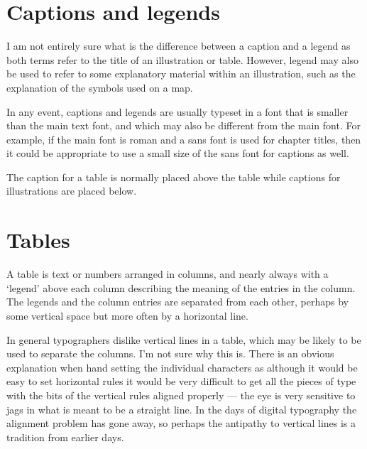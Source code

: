 \documentclass[10pt,letterpaper]{memoir}
\begin{document}
\section{Captions and legends}


    I am not entirely sure what is the difference between a
caption and a legend as both terms refer to the title of an illustration
or table. However, legend may also be used to refer to some explanatory 
material within an illustration, such as the explanation of the symbols
used on a map.

    In any event, captions and legends are usually typeset in a font that
is smaller than the main text font, and which may also be different from the
main font. For example, if the main font is roman and a sans font is used
for chapter titles, then it could be appropriate to use a small size
of the sans font for captions as well.

    The caption for a table is normally placed above the table while
captions for illustrations are placed below.


\section{Tables}


    A table is text or numbers arranged in columns, and nearly always
with a `legend' above each column describing the meaning of
the entries in the column. The legends and the column entries are
separated from each other, perhaps by some vertical space but more often
by a horizontal line.

    In general typographers dislike vertical lines in a table, which may
be likely to be used to separate the columns. I'm not sure why this is.
There is an obvious explanation when hand setting the individual characters
as although it would be easy to set horizontal rules it would be very 
difficult to get all the pieces of type with the bits of the vertical rules
aligned properly --- the eye is very sensitive to jags in what is meant to
be a straight line. In the days of digital typography the alignment problem
has gone away, so perhaps the antipathy to vertical lines is a tradition
from earlier days.
\end{document}
